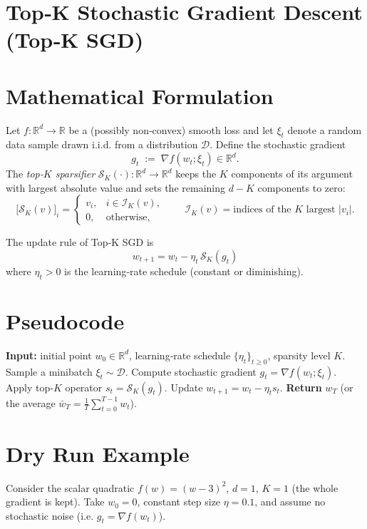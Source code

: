 \documentclass{article}
\newcommand{\topk}[1]{\mathcal{S}_K(#1)} %
\begin{document}
\section*{Top‑K Stochastic Gradient Descent (Top‑K SGD)}

\section*{Mathematical Formulation}
Let $f:\mathbb{R}^d\rightarrow\mathbb{R}$ be a (possibly non‑convex) smooth loss and let $\xi_t$ denote a random data sample drawn i.i.d. from a distribution $\mathcal{D}$.  
Define the stochastic gradient
\[
g_t \;:=\; \nabla f(w_t;\xi_t)\in\mathbb{R}^d .
\]
The \emph{top‑$K$ sparsifier} $\topk{\cdot}: \mathbb{R}^d\rightarrow\mathbb{R}^d$ keeps the $K$ components of its argument with largest absolute value and sets the remaining $d-K$ components to zero:
\[
\big[\topk{v}\big]_i = 
\begin{cases}
v_i, & i\in\mathcal{I}_K(v),\\[2mm]
0,   & \text{otherwise},
\end{cases}
\qquad
\mathcal{I}_K(v)=\text{indices of the $K$ largest }|v_i|.
\]

The update rule of Top‑K SGD is
\begin{equation}
\boxed{ \; w_{t+1}=w_t-\eta_t\,\topk{g_t}\; } \label{eq:update}
\end{equation}
where $\eta_t>0$ is the learning‑rate schedule (constant or diminishing).  

\section*{Pseudocode}
\begin{algorithm}[H]
\caption{Top‑K SGD}
\begin{algorithmic}[1]
\STATE \textbf{Input:} initial point $w_0\in\mathbb{R}^d$, learning‑rate schedule $\{\eta_t\}_{t\ge0}$, sparsity level $K$.
    \STATE Sample a minibatch $\xi_t\sim\mathcal{D}$.
    \STATE Compute stochastic gradient $g_t=\nabla f(w_t;\xi_t)$.
    \STATE Apply top‑$K$ operator $s_t=\topk{g_t}$.
    \STATE Update $w_{t+1}=w_t-\eta_t s_t$.
\ENDFOR
\STATE \textbf{Return} $w_T$ (or the average $\bar w_T=\frac1T\sum_{t=0}^{T-1}w_t$).
\end{algorithmic}
\end{algorithm}

\section*{Dry Run Example}
Consider the scalar quadratic $f(w)=(w-3)^2$, $d=1$, $K=1$ (the whole gradient is kept).  
Take $w_0=0$, constant step size $\eta=0.1$, and assume no stochastic noise (i.e. $g_t=\nabla f(w_t)$).
\end{document}
